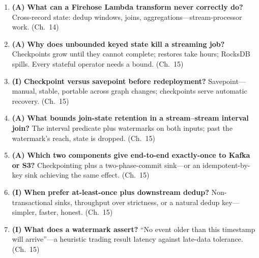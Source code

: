 \begin{enumerate}
    The intermediate S3 staging prefix---needs lifecycle rules and a
    \texttt{DeliveryToRedshift.Success} alarm. (Ch.~14)
    \item \textbf{(A)} \textbf{What can a Firehose Lambda transform never correctly do?}
    Cross-record state: dedup windows, joins, aggregations---stream-processor work. (Ch.~14)
    \item \textbf{(A)} \textbf{Why does unbounded keyed state kill a streaming job?}
    Checkpoints grow until they cannot complete; restores take hours; RocksDB spills. Every
    stateful operator needs a bound. (Ch.~15)
    \item \textbf{(I)} \textbf{Checkpoint versus savepoint before redeployment?}
    Savepoint---manual, stable, portable across graph changes; checkpoints serve automatic
    recovery. (Ch.~15)
    \item \textbf{(A)} \textbf{What bounds join-state retention in a stream--stream interval join?}
    The interval predicate plus watermarks on both inputs; past the watermark's reach, state is
    dropped. (Ch.~15)
    \item \textbf{(A)} \textbf{Which two components give end-to-end exactly-once to Kafka or S3?}
    Checkpointing plus a two-phase-commit sink---or an idempotent-by-key sink achieving the same
    effect. (Ch.~15)
    \item \textbf{(I)} \textbf{When prefer at-least-once plus downstream dedup?}
    Non-transactional sinks, throughput over strictness, or a natural dedup key---simpler, faster,
    honest. (Ch.~15)
    \item \textbf{(I)} \textbf{What does a watermark assert?}
    ``No event older than this timestamp will arrive''---a heuristic trading result latency against
    late-data tolerance. (Ch.~15)
\end{enumerate}

